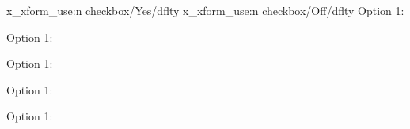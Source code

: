 \documentclass{article}
\begin{document}
\ExplSyntaxOn
x\pdf_xform_use:n {checkbox/Yes/dflt}y
x\pdf_xform_use:n {checkbox/Off/dflt}y
\ExplSyntaxOff
Option 1: 

Option 1: 

Option 1: 

Option 1: 

Option 1: 

\end{document}
